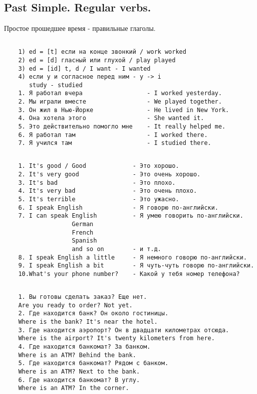 \subsection{Past Simple. Regular verbs.}
Простое прошедшее время - правильные глаголы.
\subsection*{}
\begin{verbatim}
    1) ed = [t] если на конце звонкий / work worked
    2) ed = [d] гласный или глухой / play played
    3) ed = [id] t, d / I want - I wanted
    4) если y и согласное перед ним - y -> i 
       study - studied
    1. Я работал вчера                  - I worked yesterday.
    2. Мы играли вместе                 - We played together.
    3. Он жил в Нью-Йорке               - He lived in New York.
    4. Она хотела этого                 - She wanted it.
    5. Это действительно помогло мне    - It really helped me.
    6. Я работал там                    - I worked there.
    7. Я учился там                     - I studied there.
\end{verbatim}

\subsection*{}
\begin{verbatim}
    1. It's good / Good             - Это хорошо.
    2. It's very good               - Это очень хорошо.
    3. It's bad                     - Это плохо.
    4. It's very bad                - Это очень плохо.
    5. It's terrible                - Это ужасно.
    6. I speak English              - Я говорю по-английски.
    7. I can speak English          - Я умею говорить по-английски.
                   German
                   French
                   Spanish
                   and so on        - и т.д.
    8. I speak English a little     - Я немного говорю по-английски.
    9. I speak English a bit        - Я чуть-чуть говорю по-английски.
    10.What's your phone number?    - Какой у тебя номер телефона?
\end{verbatim}

\subsection*{}
\begin{verbatim}
    1. Вы готовы сделать заказ? Еще нет.
    Are you ready to order? Not yet.
    2. Где находится банк? Он около гостиницы.
    Where is the bank? It's near the hotel.
    3. Где находится аэропорт? Он в двадцати километрах отсюда.
    Where is the airport? It's twenty kilometers from here.
    4. Где находится банкомат? За банком.
    Where is an ATM? Behind the bank.
    5. Где находится банкомат? Рядом с банком.
    Where is an ATM? Next to the bank.
    6. Где находится банкомат? В углу.
    Where is an ATM? In the corner.
\end{verbatim}

